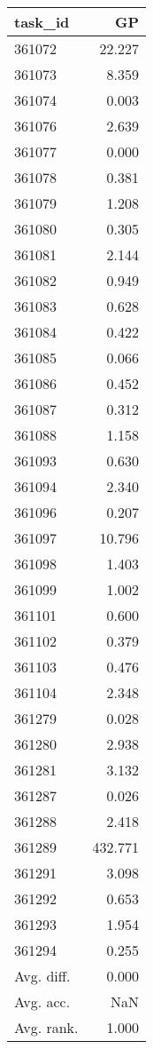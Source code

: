 \begin{tabular}{lr}
\toprule
task\_id & GP \\
\midrule
361072 & 22.227 \\
361073 & 8.359 \\
361074 & 0.003 \\
361076 & 2.639 \\
361077 & 0.000 \\
361078 & 0.381 \\
361079 & 1.208 \\
361080 & 0.305 \\
361081 & 2.144 \\
361082 & 0.949 \\
361083 & 0.628 \\
361084 & 0.422 \\
361085 & 0.066 \\
361086 & 0.452 \\
361087 & 0.312 \\
361088 & 1.158 \\
361093 & 0.630 \\
361094 & 2.340 \\
361096 & 0.207 \\
361097 & 10.796 \\
361098 & 1.403 \\
361099 & 1.002 \\
361101 & 0.600 \\
361102 & 0.379 \\
361103 & 0.476 \\
361104 & 2.348 \\
361279 & 0.028 \\
361280 & 2.938 \\
361281 & 3.132 \\
361287 & 0.026 \\
361288 & 2.418 \\
361289 & 432.771 \\
361291 & 3.098 \\
361292 & 0.653 \\
361293 & 1.954 \\
361294 & 0.255 \\
Avg. diff. & 0.000 \\
Avg. acc. & NaN \\
Avg. rank. & 1.000 \\
\bottomrule
\end{tabular}
